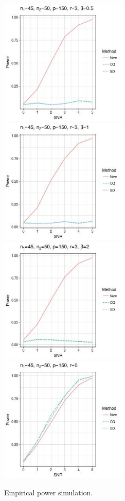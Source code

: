 \documentclass[review]{elsarticle}
\theoremstyle{plain}
\theoremstyle{definition}
\theoremstyle{remark}
\begin{document}
\begin{figure}
    \centering 
    \includegraphics[height=6cm]{code/fig1.jpeg}
    \includegraphics[height=6cm]{code/fig2.jpeg}
    \\
    \includegraphics[height=6cm]{code/fig3.jpeg}
    \includegraphics[height=6cm]{code/fig4.jpeg}
    \caption{Empirical power simulation.}\label{fig:fig1}
\end{figure}
\end{document}
